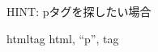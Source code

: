\documentclass[text08.tex]{subfiles}
\begin{document}
\begin{tcolorbox}[title=\useOmetoi,breakable]\label{Q:tag}
  \begin{enumerate}
    HINT: pタグを探したい場合
    
    htmltag html, “p”, tag
  \end{enumerate}
\end{tcolorbox}


\end{document}
